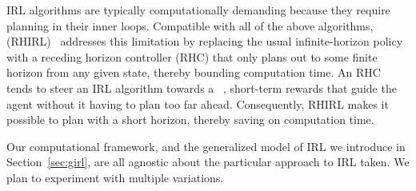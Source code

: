 IRL algorithms are typically computationally demanding because they
require planning in their inner loops.
%
Compatible with all of the above algorithms,  (RHIRL)~\cite{macglashan15b} addresses this limitation by
replacing the usual infinite-horizon policy with a receding horizon
controller (RHC) that only plans out to some finite horizon from any
given state, thereby bounding computation time. An RHC tends to steer
an IRL algorithm towards a ~\cite{Ng:1999:PIU:645528.657613},
short-term rewards that guide the agent without it having to plan too
far ahead.  Consequently, RHIRL makes it possible to plan with a short
horizon, thereby saving on computation time.

Our computational framework, and the generalized model of IRL we
introduce in Section~\ref{sec:girl}, are all agnostic about the
particular approach to IRL taken.  We plan to experiment with multiple
variations.


